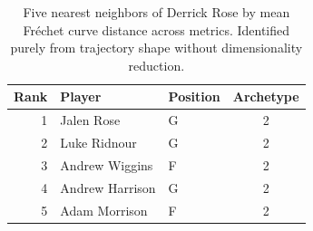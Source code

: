 \begin{table}[htbp]
  \centering\small
  \begin{tabular}{rllc}
    \toprule
    Rank & Player & Position & Archetype \\
    \midrule
    1 & Jalen Rose & G & 2 \\
    2 & Luke Ridnour & G & 2 \\
    3 & Andrew Wiggins & F & 2 \\
    4 & Andrew Harrison & G & 2 \\
    5 & Adam Morrison & F & 2 \\
    \bottomrule
  \end{tabular}
  \caption{Five nearest neighbors of Derrick Rose by mean Fr\'{e}chet curve distance across metrics. Identified purely from trajectory shape without dimensionality reduction.}
  \label{tab:Derrick_Rose_frechet_curve_neighbors}
\end{table}

